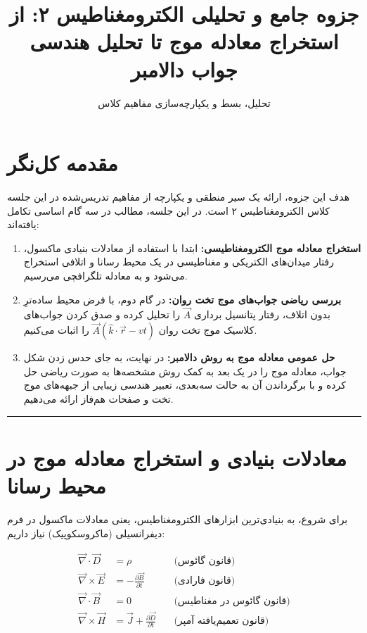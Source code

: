 \documentclass[12pt,a4paper]{article}
\title{\textbf{جزوه جامع و تحلیلی الکترومغناطیس ۲: از استخراج معادله موج تا تحلیل هندسی جواب دالامبر}}
\author{تحلیل، بسط و یکپارچه‌سازی مفاهیم کلاس}
\date{}
\begin{document}
\maketitle

\section*{مقدمه کل‌نگر}
هدف این جزوه، ارائه یک سیر منطقی و یکپارچه از مفاهیم تدریس‌شده در این جلسه کلاس الکترومغناطیس ۲ است. در این جلسه، مطالب در سه گام اساسی تکامل یافته‌اند:
\begin{enumerate}
    \item \textbf{استخراج معادله موج الکترومغناطیسی:} ابتدا با استفاده از معادلات بنیادی ماکسول، رفتار میدان‌های الکتریکی و مغناطیسی در یک محیط رسانا و اتلافی استخراج می‌شود و به معادله تلگرافچی می‌رسیم.
    \item \textbf{بررسی ریاضی جواب‌های موج تخت روان:} در گام دوم، با فرض محیط ساده‌ترِ بدون اتلاف، رفتار پتانسیل برداری $\vec{A}$ را تحلیل کرده و صدق کردن جواب‌های کلاسیک موج تخت روان $\vec{A}(\hat{k}\cdot\vec{r}-vt)$ را اثبات می‌کنیم.
    \item \textbf{حل عمومی معادله موج به روش دالامبر:} در نهایت، به جای حدس زدن شکل جواب، معادله موج را در یک بعد به کمک روش مشخصه‌ها به صورت ریاضی حل کرده و با برگرداندن آن به حالت سه‌بعدی، تعبیر هندسی زیبایی از جبهه‌های موج تخت و صفحات هم‌فاز ارائه می‌دهیم.
\end{enumerate}

\hrule
\vspace{0.5cm}

\section{معادلات بنیادی و استخراج معادله موج در محیط رسانا}
برای شروع، به بنیادی‌ترین ابزارهای الکترومغناطیس، یعنی معادلات ماکسول در فرم دیفرانسیلی (ماکروسکوپیک) نیاز داریم:

\begin{align}
	\vec{\nabla} \cdot \vec{D} &= \rho \quad &\text{(قانون گائوس)} \label{eq:gauss} \\
	\vec{\nabla} \times \vec{E} &= -\frac{\partial \vec{B}}{\partial t} \quad &\text{(قانون فارادی)} \label{eq:faraday} \\
	\vec{\nabla} \cdot \vec{B} &= 0 \quad &\text{(قانون گائوس در مغناطیس)} \label{eq:gauss_mag} \\
	\vec{\nabla} \times \vec{H} &= \vec{J} + \frac{\partial \vec{D}}{\partial t} \quad &\text{(قانون تعمیم‌یافته آمپر)} \label{eq:ampere}
\end{align}
\end{document}
